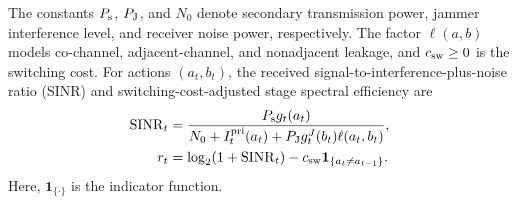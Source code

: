 \documentclass[conference]{IEEEtran}
\begin{document}
The constants $P_{\rm s}$, $P_{\rm J}$, and $N_0$ denote secondary transmission power, jammer interference level, and receiver noise power, respectively.
The factor $\ell(a,b)$ models co-channel, adjacent-channel, and nonadjacent leakage, and $c_{\rm sw}\geq0$ is the switching cost.
For actions $(a_t,b_t)$, the received signal-to-interference-plus-noise ratio (SINR) and switching-cost-adjusted stage spectral efficiency are
\begin{equation}
\begin{aligned}
\operatorname{SINR}_t
&=\frac{P_{\rm s}g_t(a_t)}{N_0+I_t^{\rm pri}(a_t)+P_{\rm J}g_t^J(b_t)\ell(a_t,b_t)},\\
r_t
&=\log_2(1+\operatorname{SINR}_t)-c_{\rm sw}\mathbf 1_{\{a_t\neq a_{t-1}\}}.
\end{aligned}
\label{eq:reward}
\end{equation}
Here, $\mathbf 1_{\{\cdot\}}$ is the indicator function.
\end{document}
